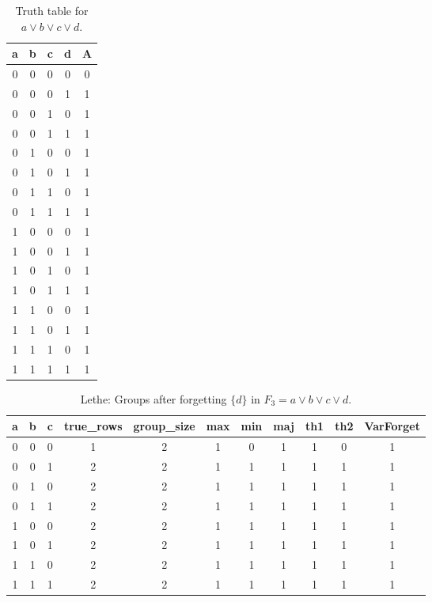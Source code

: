 \begin{table}[!tb]
    \centering
    \begin{tabular}{|c|c|c|c|c|}
        \hline
        \textbf{a} & \textbf{b} & \textbf{c} & \textbf{d} & \textbf{A} \\ \hline
        0 & 0 & 0 & 0 & 0 \\ \hline
        0 & 0 & 0 & 1 & 1 \\ \hline
        0 & 0 & 1 & 0 & 1 \\ \hline
        0 & 0 & 1 & 1 & 1 \\ \hline
        0 & 1 & 0 & 0 & 1 \\ \hline
        0 & 1 & 0 & 1 & 1 \\ \hline
        0 & 1 & 1 & 0 & 1 \\ \hline
        0 & 1 & 1 & 1 & 1 \\ \hline
        1 & 0 & 0 & 0 & 1 \\ \hline
        1 & 0 & 0 & 1 & 1 \\ \hline
        1 & 0 & 1 & 0 & 1 \\ \hline
        1 & 0 & 1 & 1 & 1 \\ \hline
        1 & 1 & 0 & 0 & 1 \\ \hline
        1 & 1 & 0 & 1 & 1 \\ \hline
        1 & 1 & 1 & 0 & 1 \\ \hline
        1 & 1 & 1 & 1 & 1 \\ \hline
    \end{tabular}
    \caption{Truth table for $a \lor b \lor c \lor d$.}
    \label{tab:truthtab}
\end{table}

\begin{table}[!tb]
    \centering
    \begin{tabular}{|c|c|c|c|c|c|c|c|c|c|c|}
        \hline
        \textbf{a} & \textbf{b} & \textbf{c} & \textbf{true\_rows} & \textbf{group\_size} & \textbf{max} & \textbf{min} & \textbf{maj} & \textbf{th1} & \textbf{th2} & \textbf{VarForget} \\ \hline
        \rowcolor{gray!40} 0 & 0 & 0 & 1 & 2 & 1 & 0 & 1 & 1 & 0 & 1 \\ \hline
        \rowcolor{blue!40} 0 & 0 & 1 & 2 & 2 & 1 & 1 & 1 & 1 & 1 & 1 \\ \hline
        \rowcolor{red!40} 0 & 1 & 0 & 2 & 2 & 1 & 1 & 1 & 1 & 1 & 1 \\ \hline
        \rowcolor{green!40} 0 & 1 & 1 & 2 & 2 & 1 & 1 & 1 & 1 & 1 & 1 \\ \hline
        \rowcolor{yellow!40} 1 & 0 & 0 & 2 & 2 & 1 & 1 & 1 & 1 & 1 & 1 \\ \hline
        \rowcolor{gray!40} 1 & 0 & 1 & 2 & 2 & 1 & 1 & 1 & 1 & 1 & 1 \\ \hline
        \rowcolor{blue!40} 1 & 1 & 0 & 2 & 2 & 1 & 1 & 1 & 1 & 1 & 1 \\ \hline
        \rowcolor{red!40} 1 & 1 & 1 & 2 & 2 & 1 & 1 & 1 & 1 & 1 & 1 \\ \hline
    \end{tabular}
    \caption{Lethe: Groups after forgetting $\{d\}$ in $F_{3} = a \lor b \lor c \lor d$.}
    \label{tab:lethe-F3-d-groups}
\end{table}
